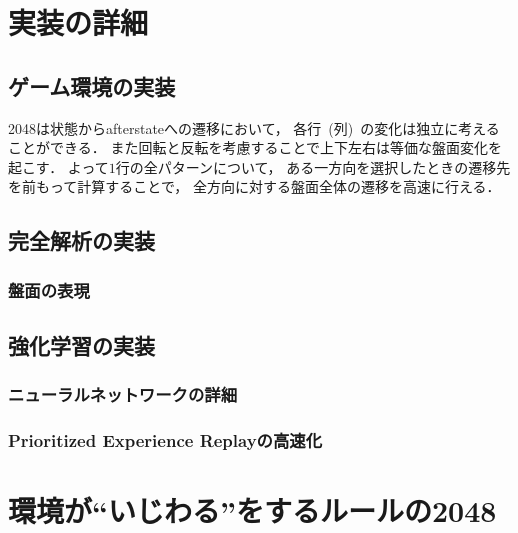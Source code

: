\chapter{実装の詳細}

\section{ゲーム環境の実装}
2048は状態からafterstateへの遷移において， 各行~(列)~の変化は独立に考えることができる．
また回転と反転を考慮することで上下左右は等価な盤面変化を起こす．
よって$1$行の全パターンについて， ある一方向を選択したときの遷移先を前もって計算することで， 全方向に対する盤面全体の遷移を高速に行える．

\section{完全解析の実装}
\subsection{盤面の表現}

\section{強化学習の実装}
\subsection{ニューラルネットワークの詳細}

\subsection{Prioritized Experience Replayの高速化}

\chapter{環境が“いじわる”をするルールの2048}
